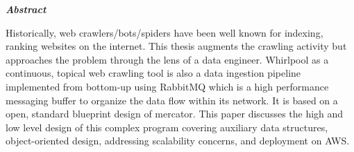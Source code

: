 \begin{center}




\textit{\bf Abstract}

\hfill\break

\end{center}

\vspace{1mm}

\normalsize
\noindent Historically, web crawlers/bots/spiders have been well known for indexing, ranking
websites on the internet. This thesis augments the crawling activity but approaches
the problem through the lens of a data engineer. Whirlpool as a continuous, topical
web crawling tool is also a data ingestion pipeline implemented from bottom-up using
RabbitMQ which is a high performance messaging buffer to organize the data flow
within its network. It is based on a open, standard blueprint design of mercator.
This paper discusses the high and low level design of this complex program covering
auxiliary data structures, object-oriented design, addressing scalability concerns, and
deployment on AWS. 

